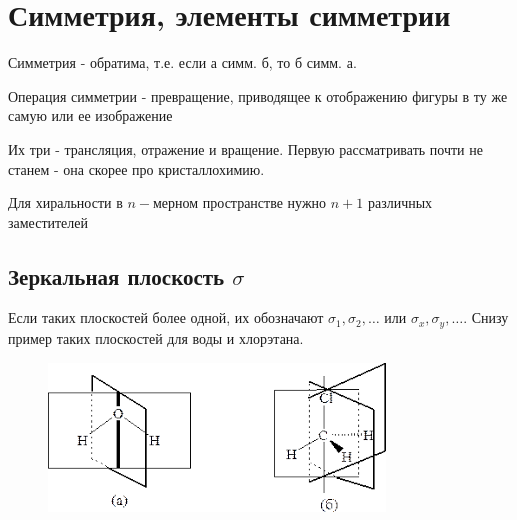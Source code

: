 \documentclass[11pt]{article}
\begin{document}
\section*{Симметрия, элементы симметрии}

Симметрия - обратима, т.е. если а симм. б, то б симм. а.

Операция симметрии - превращение, приводящее к отображению фигуры в ту же самую или ее изображение

Их три - трансляция, отражение и вращение. Первую рассматривать почти не станем - она скорее про кристаллохимию.

Для хиральности в $n-$мерном пространстве нужно $n+1$ различных заместителей

\subsection*{Зеркальная плоскость $\sigma$}
Если таких плоскостей более одной, их обозначают $\sigma_1, \sigma_2, \ldots$ или $\sigma_x, \sigma_y, \ldots$. Снизу пример таких плоскостей для воды и хлорэтана.
\begin{figure}[htp]
\centering
\includegraphics[scale=1.00]{mirror-plans.png}
\end{figure}
\end{document}
